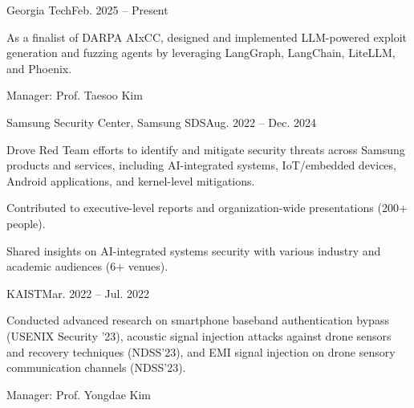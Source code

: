 \begin{timeitemize}{Georgia Tech}{Feb. 2025 -- Present}
    \item As a finalist of DARPA AIxCC, designed and implemented LLM-powered exploit generation and fuzzing agents by leveraging LangGraph, LangChain, LiteLLM, and Phoenix.
    \item Manager: Prof. Taesoo Kim
\end{timeitemize}

\begin{timeitemize}{Samsung Security Center, Samsung SDS}{Aug. 2022 -- Dec. 2024}
    \item Drove Red Team efforts to identify and mitigate security threats across Samsung products and services, including AI-integrated systems, IoT/embedded devices, Android applications, and kernel-level mitigations.
    \item Contributed to executive-level reports and organization-wide presentations (200+ people).
    \item Shared insights on AI-integrated systems security with various industry and academic audiences (6+ venues).
\end{timeitemize}

\begin{timeitemize}{KAIST}{Mar. 2022 -- Jul. 2022}
    \item Conducted advanced research on smartphone baseband authentication bypass (USENIX Security '23), acoustic signal injection attacks against drone sensors and recovery techniques (NDSS'23), and EMI signal injection on drone sensory communication channels (NDSS'23).
    \item Manager: Prof. Yongdae Kim
\end{timeitemize}


